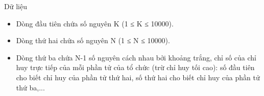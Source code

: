 Dữ liệu
\begin{itemize}
	\item Dòng đầu tiên chứa số nguyên K (1 ≤ K ≤ 10000).
	\item Dòng thứ hai chứa số nguyên N (1 ≤ N ≤ 10000).
	\item Dòng thứ ba chứa N-1 số nguyên cách nhau bởi khoảng trắng, chỉ số của chỉ huy trực tiếp của mỗi phần tử của tổ chức (trừ chỉ huy tối cao): số đầu tiên cho biết chỉ huy của phần tử thứ hai, số thứ hai cho biết chỉ huy của phần tử thứ ba,...
\end{itemize}